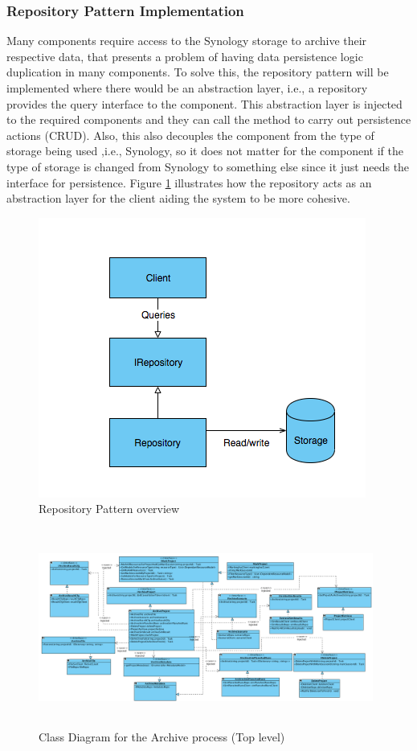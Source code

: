 \subsubsection{Repository Pattern Implementation}
Many components require access to the Synology storage to archive their respective data, that presents a problem of having data
persistence logic duplication in many components. To solve this, the repository pattern will be implemented where there would be an abstraction layer, i.e., a repository
provides the query interface to the component. This abstraction layer is injected to the required components and they can call the 
method to carry out persistence actions (CRUD). Also, this also decouples the component from the type of storage being used ,i.e., Synology, so it does not
matter for the component if the type of storage is changed from Synology to something else since it just needs the interface for persistence. Figure 
\ref{fig:repositoryPattern} illustrates how the repository acts as an abstraction layer for the client aiding the system to be more cohesive. 
\begin{figure}[H]
    \centering \includegraphics[scale=0.7]{grafiken/repositoryPattern.png}
    \caption{Repository Pattern overview}
    \label{fig:repositoryPattern}
\end{figure}


\begin{figure}[H]
    \centering \includegraphics[height=6.5cm, angle=90, origin=c, width=11cm]{grafiken/archiveClass.png}
    \caption{Class Diagram for the Archive process (Top level)}
    \label{fig:archiveClassDiagram}
\end{figure}

